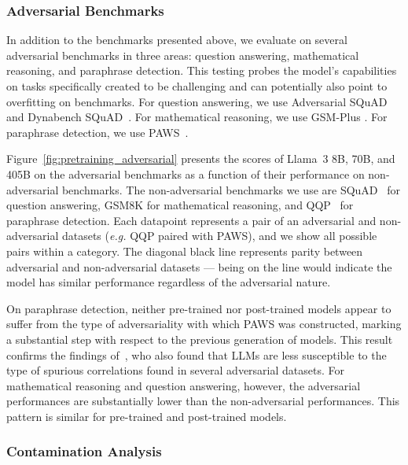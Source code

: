 \subsubsection{Adversarial Benchmarks}
\label{subsec:adversarial}

In addition to the benchmarks presented above, we evaluate on several adversarial benchmarks in three areas: question answering, mathematical reasoning, and paraphrase detection. This testing probes the model's capabilities on tasks specifically created to be challenging and can potentially also point to overfitting on benchmarks. For question answering, we use Adversarial SQuAD~\citep{jia-liang-2017-adversarial} and Dynabench SQuAD~\citep{kiela-etal-2021-dynabench}. For mathematical reasoning, we use GSM-Plus \citep{li2024gsm}. For paraphrase detection, we use PAWS~\citep{zhang-etal-2019-paws}.

Figure~\ref{fig:pretraining_adversarial} presents the scores of Llama~3 8B, 70B, and 405B on the adversarial benchmarks as a function of their performance on non-adversarial benchmarks. The non-adversarial benchmarks we use are SQuAD~\citep{rajpurkar-etal-2016-squad} for question answering, GSM8K for mathematical reasoning, and QQP~\citep{quoraFirstQuora} for paraphrase detection. Each datapoint represents a pair of an adversarial and non-adversarial datasets (\emph{e.g.} QQP paired with PAWS), and we show all possible pairs within a category. The diagonal black line represents parity between adversarial and non-adversarial datasets --- being on the line would indicate the model has similar performance regardless of the adversarial nature.

On paraphrase detection, neither pre-trained nor post-trained models appear to suffer from the type of adversariality with which PAWS was constructed, marking a substantial step with respect to the previous generation of models. This result confirms the findings of~\citet{weber-etal-2023-mind}, who also found that LLMs are less susceptible to the type of spurious correlations found in several adversarial datasets. For mathematical reasoning and question answering, however, the adversarial performances are substantially lower than the non-adversarial performances. This pattern is similar for pre-trained and post-trained models.

\subsubsection{Contamination Analysis}
\label{subsec:contamination_analysis}

